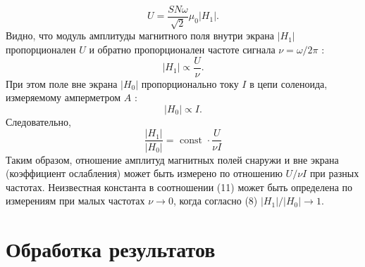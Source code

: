 \documentclass[a4paper, 12pt]{article}
\begin{document}
$$
U=\frac{S N \omega}{\sqrt{2}} \mu_0\left|H_1\right| .
$$
Видно, что модуль амплитуды магнитного поля внутри экрана $\left|H_1\right|$ пропорционален $U$ и обратно пропорционален частоте сигнала $\nu=\omega / 2 \pi$ :
$$
\left|H_1\right| \propto \frac{U}{\nu} .
$$
При этом поле вне экрана $\left|H_0\right|$ пропорционально току $I$ в цепи соленоида, измеряемому амперметром $A$ :
$$
\left|H_0\right| \propto I .
$$
Следовательно,
\begin{equation}
\frac{\left|H_1\right|}{\left|H_0\right|}=\text { const } \cdot \frac{U}{\nu I}
\end{equation}
Таким образом, отношение амплитуд магнитных полей снаружи и вне экрана (коэффициент ослабления) может быть измерено по отношению $U / \nu I$ при разных частотах. Неизвестная константа в соотношении (11) может быть определена по измерениям при малых частотах $\nu \rightarrow 0$, когда согласно (8) $\left|H_1\right| /\left|H_0\right| \rightarrow 1$.


\section{Обработка результатов}
\end{document}
